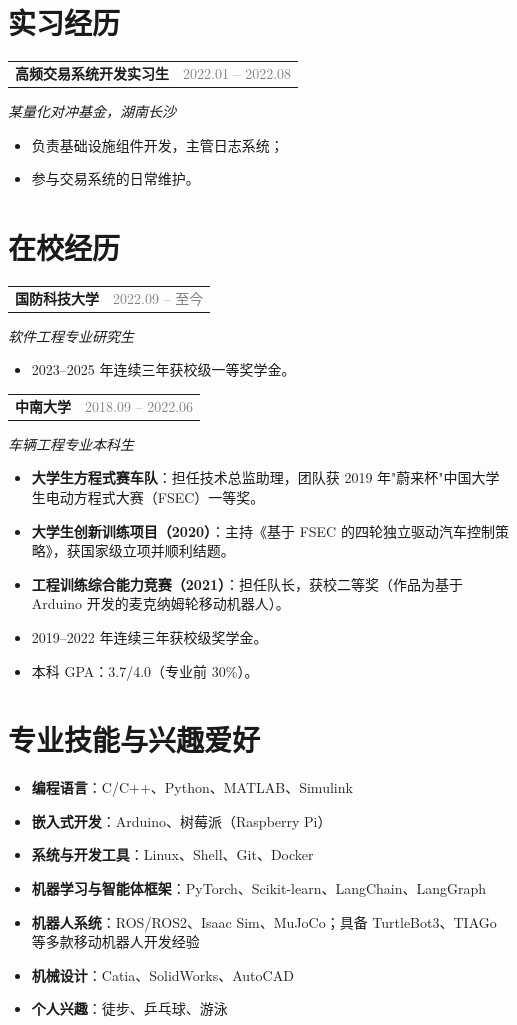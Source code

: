 \documentclass[10pt]{article}
\makeatletter
\newcommand{\entry}[3]{%
  \noindent\begin{tabular*}{\textwidth}{@{}l@{\extracolsep{\fill}}r@{}}
    \textbf{#1} & \textcolor{graytext}{#2}
  \end{tabular*}\par\vspace{-0.25em}
  \noindent\textit{#3}\par\vspace{0.22em}
}
\newcommand{\skill}[2]{\textbf{#1}：#2}
\makeatother
\begin{document}
\section{实习经历}
\entry{高频交易系统开发实习生}{2022.01 -- 2022.08}{某量化对冲基金，湖南长沙}
\begin{itemize}
\item 负责基础设施组件开发，主管日志系统；
\item 参与交易系统的日常维护。
\end{itemize}

\section{在校经历}
\entry{国防科技大学}{2022.09 -- 至今}{软件工程专业研究生}
\begin{itemize}
\item 2023--2025 年连续三年获校级一等奖学金。
\end{itemize}

\vspace{0.3em}
\entry{中南大学}{2018.09 -- 2022.06}{车辆工程专业本科生}
\begin{itemize}
\item \textbf{大学生方程式赛车队}：担任技术总监助理，团队获 2019 年"蔚来杯"中国大学生电动方程式大赛（FSEC）一等奖。
\item \textbf{大学生创新训练项目（2020）}：主持《基于 FSEC 的四轮独立驱动汽车控制策略》，获国家级立项并顺利结题。
\item \textbf{工程训练综合能力竞赛（2021）}：担任队长，获校二等奖（作品为基于 Arduino 开发的麦克纳姆轮移动机器人）。
\item 2019--2022 年连续三年获校级奖学金。
\item 本科 GPA：3.7/4.0（专业前 30\%）。
\end{itemize}

\enlargethispage{2\baselineskip}
\section{专业技能与兴趣爱好}
\begin{itemize}
\item \skill{编程语言}{C/C++、Python、MATLAB、Simulink}
\item \skill{嵌入式开发}{Arduino、树莓派（Raspberry Pi）}
\item \skill{系统与开发工具}{Linux、Shell、Git、Docker}
\item \skill{机器学习与智能体框架}{PyTorch、Scikit-learn、LangChain、LangGraph}
\item \skill{机器人系统}{ROS/ROS2、Isaac Sim、MuJoCo；具备 TurtleBot3、TIAGo 等多款移动机器人开发经验}
\item \skill{机械设计}{Catia、SolidWorks、AutoCAD}
\item \skill{个人兴趣}{徒步、乒乓球、游泳}
\end{itemize}
\end{document}
